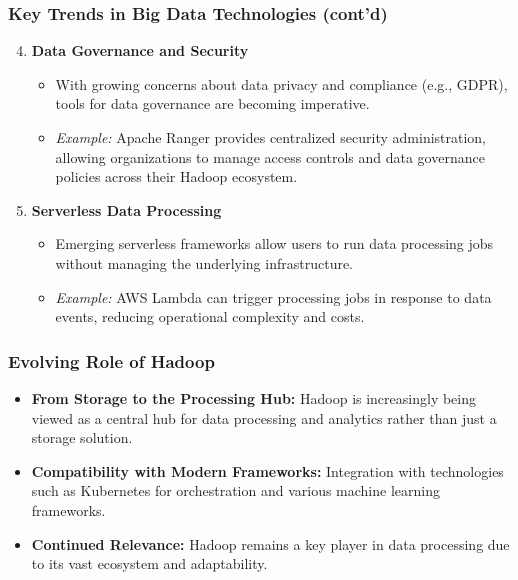 \documentclass[aspectratio=169]{beamer}
\begin{document}
\begin{frame}[fragile]
    \frametitle{Key Trends in Big Data Technologies (cont'd)}
    \begin{enumerate}
        \setcounter{enumi}{3}
        \item \textbf{Data Governance and Security}
        \begin{itemize}
            \item With growing concerns about data privacy and compliance (e.g., GDPR), tools for data governance are becoming imperative.
            \item \textit{Example:} Apache Ranger provides centralized security administration, allowing organizations to manage access controls and data governance policies across their Hadoop ecosystem.
        \end{itemize}
        
        \item \textbf{Serverless Data Processing}
        \begin{itemize}
            \item Emerging serverless frameworks allow users to run data processing jobs without managing the underlying infrastructure.
            \item \textit{Example:} AWS Lambda can trigger processing jobs in response to data events, reducing operational complexity and costs.
        \end{itemize}
    \end{enumerate}
\end{frame}

\begin{frame}[fragile]
    \frametitle{Evolving Role of Hadoop}
    \begin{itemize}
        \item \textbf{From Storage to the Processing Hub:} Hadoop is increasingly being viewed as a central hub for data processing and analytics rather than just a storage solution.
        \item \textbf{Compatibility with Modern Frameworks:} Integration with technologies such as Kubernetes for orchestration and various machine learning frameworks.
        \item \textbf{Continued Relevance:} Hadoop remains a key player in data processing due to its vast ecosystem and adaptability.
    \end{itemize}
\end{frame}
\end{document}
